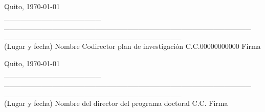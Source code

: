 \documentclass[a4paper,12pt]{article}
\begin{document}
\vspace{1cm}

\begin{flushleft}
	Quito, \today\\
	\_\_\_\_\_\_\_\_\_\_\_\_\_\_\_\_\_\_\hspace{0.1cm} \_\_\_\_\_\_\_\_\_\_\_\_\_\_\_\_\_\_\_\_\_\_\_\_\_\_\_\_\_\_\_\_\_\_\_\_\_\_\_\_\_\_\_\_\_\_  \hspace{0.3cm}\_\_\_\_\_\_\_\_\_\_\_\_\_\_\_\_\_\hspace{0.1cm}\_\_\_\_\_\_\_\_\_\_\_\_\_\_\_\_\\
	(Lugar y fecha) \hspace{0.0cm} Nombre Codirector plan de investigación \hspace{0.1cm} C.C.\hspace{0.05cm}00000000000 \hspace{0.1cm} Firma \\
\end{flushleft}

\vspace{1cm}

\begin{flushleft}
	Quito, \today\\
	\_\_\_\_\_\_\_\_\_\_\_\_\_\_\_\_\_\_\hspace{0.1cm} \_\_\_\_\_\_\_\_\_\_\_\_\_\_\_\_\_\_\_\_\_\_\_\_\_\_\_\_\_\_\_\_\_\_\_\_\_\_\_\_\_\_\_\_\_\_  \hspace{0.3cm}\_\_\_\_\_\_\_\_\_\_\_\_\_\_\_\_\_\hspace{0.1cm}\_\_\_\_\_\_\_\_\_\_\_\_\_\_\_\_\\
	(Lugar y fecha) \hspace{0.0cm} Nombre del director del programa doctoral \hspace{1.3cm} C.C.\hspace{1cm} \hspace{0.1cm} Firma \\
\end{flushleft}

%		
%	
\end{document}
